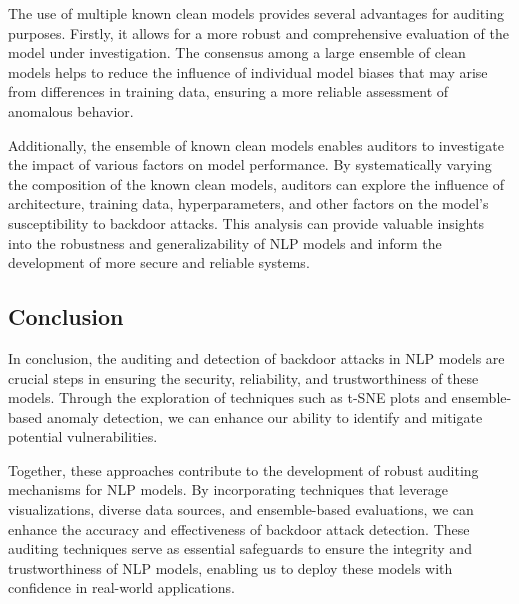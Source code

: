 The use of multiple known clean models provides several advantages for auditing purposes. Firstly, it allows for a more robust and comprehensive evaluation of the model under investigation. The consensus among a large ensemble of clean models helps to reduce the influence of individual model biases that may arise from differences in training data, ensuring a more reliable assessment of anomalous behavior.

Additionally, the ensemble of known clean models enables auditors to investigate the impact of various factors on model performance. By systematically varying the composition of the known clean models, auditors can explore the influence of architecture, training data, hyperparameters, and other factors on the model's susceptibility to backdoor attacks. This analysis can provide valuable insights into the robustness and generalizability of NLP models and inform the development of more secure and reliable systems.

\subsection{Conclusion}

In conclusion, the auditing and detection of backdoor attacks in NLP models are crucial steps in ensuring the security, reliability, and trustworthiness of these models. Through the exploration of techniques such as t-SNE plots and ensemble-based anomaly detection, we can enhance our ability to identify and mitigate potential vulnerabilities.

Together, these approaches contribute to the development of robust auditing mechanisms for NLP models. By incorporating techniques that leverage visualizations, diverse data sources, and ensemble-based evaluations, we can enhance the accuracy and effectiveness of backdoor attack detection. These auditing techniques serve as essential safeguards to ensure the integrity and trustworthiness of NLP models, enabling us to deploy these models with confidence in real-world applications.